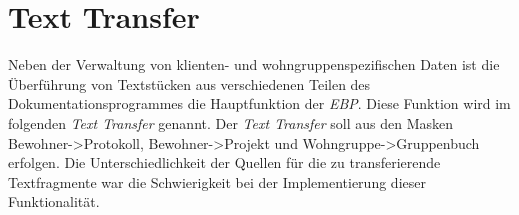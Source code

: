\section{Text Transfer}
Neben der Verwaltung von klienten- und wohngruppenspezifischen Daten ist die Überführung von Textstücken aus verschiedenen Teilen des
Dokumentationsprogrammes die Hauptfunktion der \textit{EBP}. Diese Funktion wird im folgenden \textit{Text Transfer} genannt. \newline
Der \textit{Text Transfer} soll aus den Masken Bewohner->Protokoll, Bewohner->Projekt und Wohngruppe->Gruppenbuch erfolgen. Die
Unterschiedlichkeit der Quellen für die zu transferierende Textfragmente war die Schwierigkeit bei der Implementierung dieser Funktionalität. 
